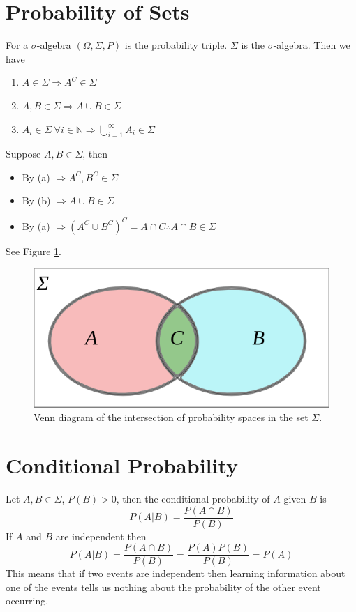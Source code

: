 \documentclass[lecture,12pt,]{pcms-l}
\begin{document}
\mainmatter
\setcounter{page}{1}

\lectureseries[\course]{\course}

\date{October 6, 2009}

\setaddress

\setcounter{lecture}{2}
\setcounter{chapter}{2}


\section{Probability of Sets}
For a $\sigma$-algebra $(\Omega, \Sigma, P)$ is the probability triple. $\Sigma$ is the $\sigma$-algebra. Then we have
\begin{enumerate}
\item $A\in\Sigma \Rightarrow A^C\in\Sigma$
\item $A, B\in\Sigma \Rightarrow A\cup B\in\Sigma$
\item $A_i\in\Sigma ~\forall i\in\mathbb{N} \Rightarrow \bigcup_{i=1}^\infty A_i\in\Sigma$
\end{enumerate}
Suppose $A,B\in\Sigma$, then
\begin{itemize}
\item By (a) $\Rightarrow A^C,B^C\in\Sigma$
\item By (b) $\Rightarrow A\cup B\in\Sigma$
\item By (a) $\Rightarrow (A^C\cup B^C)^C = A\cap C \therefore A\cap B\in\Sigma$
\end{itemize}
See Figure \ref{fig:03vennProb}.
\begin{figure}[ht!]
	\centering
	\includegraphics[width=.5\textwidth]{images/03vennProb}
	\caption{Venn diagram of the intersection of probability spaces in the set $\Sigma$.}
	\label{fig:03vennProb}
\end{figure}

\section{Conditional Probability}
Let $A,B\in\Sigma$, $P(B)>0$, then the conditional probability of $A$ given $B$ is
$$P(A|B) = \frac{P(A\cap B)}{P(B)}$$
If $A$ and $B$ are independent then
$$P(A|B) = \frac{P(A\cap B)}{P(B)} = \frac{P(A)P(B)}{P(B)} = P(A)$$
This means that if two events are independent then learning information about one of the events tells us nothing about the probability of the other event occurring.
\end{document}

